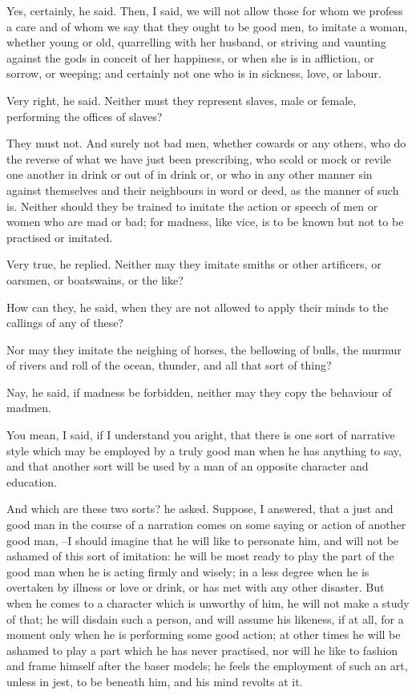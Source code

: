 Yes, certainly, he said.
Then, I said, we will not allow those for whom we profess a care and of whom we say that they ought to be good men, to imitate a woman, whether young or old, quarrelling with her husband, or striving and vaunting against the gods in conceit of her happiness, or when she is in affliction, or sorrow, or weeping; and certainly not one who is in sickness, love, or labour.

Very right, he said.
Neither must they represent slaves, male or female, performing the offices of slaves?

They must not.
And surely not bad men, whether cowards or any others, who do the reverse of what we have just been prescribing, who scold or mock or revile one another in drink or out of in drink or, or who in any other manner sin against themselves and their neighbours in word or deed, as the manner of such is. Neither should they be trained to imitate the action or speech of men or women who are mad or bad; for madness, like vice, is to be known but not to be practised or imitated.

Very true, he replied.
Neither may they imitate smiths or other artificers, or oarsmen, or boatswains, or the like?

How can they, he said, when they are not allowed to apply their minds to the callings of any of these?

Nor may they imitate the neighing of horses, the bellowing of bulls, the murmur of rivers and roll of the ocean, thunder, and all that sort of thing?

Nay, he said, if madness be forbidden, neither may they copy the behaviour of madmen.

You mean, I said, if I understand you aright, that there is one sort of narrative style which may be employed by a truly good man when he has anything to say, and that another sort will be used by a man of an opposite character and education.

And which are these two sorts? he asked.
Suppose, I answered, that a just and good man in the course of a narration comes on some saying or action of another good man, --I should imagine that he will like to personate him, and will not be ashamed of this sort of imitation: he will be most ready to play the part of the good man when he is acting firmly and wisely; in a less degree when he is overtaken by illness or love or drink, or has met with any other disaster. But when he comes to a character which is unworthy of him, he will not make a study of that; he will disdain such a person, and will assume his likeness, if at all, for a moment only when he is performing some good action; at other times he will be ashamed to play a part which he has never practised, nor will he like to fashion and frame himself after the baser models; he feels the employment of such an art, unless in jest, to be beneath him, and his mind revolts at it.

